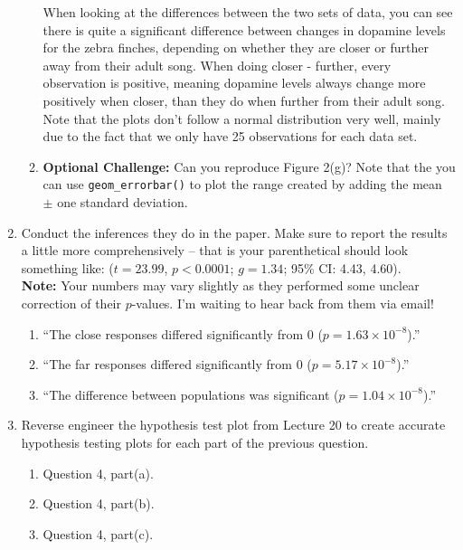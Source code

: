 \documentclass{article}\usepackage[]{graphicx}\usepackage[]{xcolor}
\begin{document}
\begin{enumerate}
\begin{enumerate}
When looking at the differences between the two sets of data, you can see there is quite a significant difference between changes in dopamine levels for the zebra finches, depending on whether they are closer or further away from their adult song. When doing closer - further, every observation is positive, meaning dopamine levels always change more positively when closer, than they do when further from their adult song. \\
Note that the plots don't follow a normal distribution very well, mainly due to the fact that we only have 25 observations for each data set.
  \item \textbf{Optional Challenge:} Can you reproduce Figure 2(g)?
  Note that the you can use \texttt{geom\_errorbar()} to plot
  the range created by adding the mean $\pm$ one standard deviation.
\end{enumerate}
\item Conduct the inferences they do in the paper. Make sure to report the results
a little more comprehensively -- that is your parenthetical should look something
like: ($t=23.99$, $p<0.0001$; $g=1.34$; 95\% CI: 4.43, 4.60).\\
\textbf{Note:} Your numbers may vary slightly as they performed some unclear
correction of their $p$-values. I'm waiting to hear back from them via email!
\begin{enumerate}
  \item ``The close responses differed significantly from 0 ($p=1.63 \times 10^{-8}$).''
  \item ``The far responses differed significantly from 0 ($p=5.17 \times 10^{-8}$).''
  \item ``The difference between populations was significant ($p=1.04 \times10^{-8}$).''
\end{enumerate}
\item Reverse engineer the hypothesis test plot from Lecture 20 to create accurate
hypothesis testing plots for each part of the previous question.
\begin{enumerate}
  \item Question 4, part(a).
  \item Question 4, part(b).
  \item Question 4, part(c).
\end{enumerate}
\end{enumerate}



\end{document}
